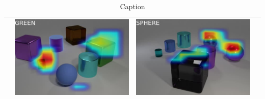 \begin{table}
\begin{tabular}{@{}cccc@{}}
\begin{minipage}{.2\textwidth}
    \end{minipage}
    &
    \begin{minipage}{.2\textwidth}
      \includegraphics[width=\linewidth]{figures/CLEVR_activations/green_color01.jpg}
    \end{minipage}
    &
    \begin{minipage}{.2\textwidth}
      \includegraphics[width=\linewidth]{figures/CLEVR_activations/sphere_shape01.jpg}
    \end{minipage}
\\


\bottomrule
\end{tabular}
\caption[Caption]{Caption}
\end{table}